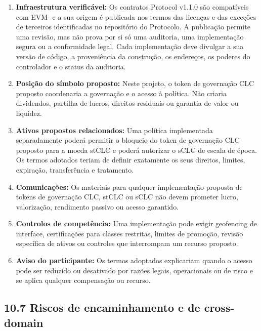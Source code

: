 \documentclass[11pt]{article}
\begin{document}
\begin{enumerate}[leftmargin=*]
\item \textbf{Infraestrutura verificável:} Os contratos Protocol v1.1.0 são compatíveis com EVM- e a sua origem é publicada nos termos das licenças e das exceções de terceiros identificadas no repositório do Protocolo. A publicação permite uma revisão, mas não prova por si só uma auditoria, uma implementação segura ou a conformidade legal. Cada implementação deve divulgar a sua versão de código, a proveniência da construção, os endereços, os poderes do controlador e o status da auditoria.
\item \textbf{Posição do símbolo proposto:} Neste projeto, o token de governação CLC proposto coordenaria a governação e o acesso à política. Não criaria dividendos, partilha de lucros, direitos residuais ou garantia de valor ou liquidez.
\item \textbf{Ativos propostos relacionados:} Uma política implementada separadamente poderá permitir o bloqueio do token de governação CLC proposto para a moeda stCLC e poderá autorizar o sCLC de escala de época. Os termos adotados teriam de definir exatamente os seus direitos, limites, expiração, transferência e tratamento.
\item \textbf{Comunicações:} Os materiais para qualquer implementação proposta de tokens de governação CLC, stCLC ou sCLC não devem prometer lucro, valorização, rendimento passivo ou acesso garantido.
\item \textbf{Controlos de competência:} Uma implementação pode exigir geofencing de interface, certificações para classes restritas, limites de promoção, revisão específica de ativos ou controles que interrompam um recurso proposto.
\item \textbf{Aviso do participante:} Os termos adoptados explicariam quando o acesso pode ser reduzido ou desativado por razões legais, operacionais ou de risco e se aplica qualquer compensação ou recurso.
\end{enumerate}
\subsection*{10.7 Riscos de encaminhamento e de cross-domain}
\end{document}
